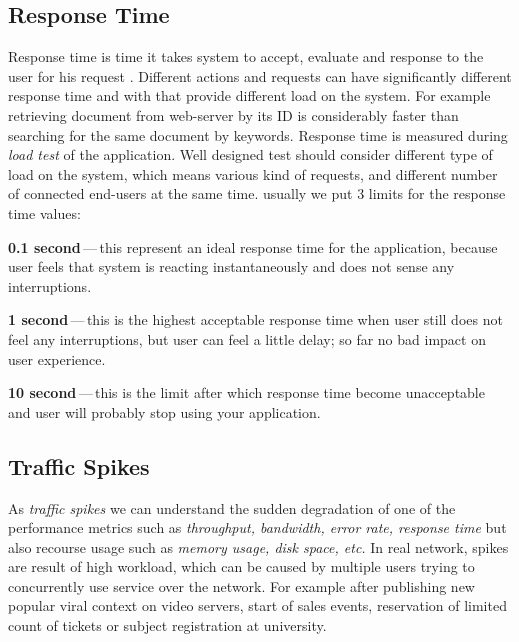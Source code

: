 \subsection*{Response Time}
\label{Response Time 1}
Response time is time it takes system to accept, evaluate and response to the user for his request . Different actions and requests can have significantly different response time and with that provide different load on the system. For example retrieving document from web-server by its ID is considerably faster than searching for the same document by keywords. Response time is measured during \emph{load test} \cite{Manzor:APTB} of the application. Well designed test should consider different type of load on the system, which means various kind of requests, and different 
number of connected end-users at the same time. usually we put 3 limits for the response time values: 

\begin{description}
	\setlength\itemsep{0em}
	\item \textbf{0.1 second}\,---\,this represent an ideal response time for the application, because user feels that system is reacting instantaneously and does not sense any interruptions.
	\item \textbf{1 second}\,---\,this is the highest acceptable response time when user still does not feel any interruptions, but user can feel a little delay; so far no bad impact on user experience.
	\item \textbf{10 second}\,---\,this is the limit after which response time become unacceptable and user will probably stop using your application.
\end{description}


\subsection*{Traffic Spikes}
As \emph{traffic spikes} \cite{Kurkova:Thesis:2017, AMC:SPIKES} we can understand the sudden degradation of one of the performance metrics such as \emph{throughput, bandwidth, error rate, response time} but also recourse usage such as \emph{memory usage, disk space, etc.} In real network, spikes are result of high workload, which can be caused by multiple users trying to concurrently use service over the network. For example after publishing new popular viral context on video servers, start of sales events, reservation of limited count of tickets or subject registration at university.


